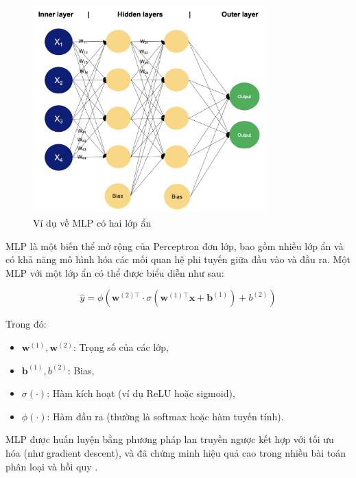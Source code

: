 \begin{figure}[H]
    \centering
    \includegraphics[width=0.8\textwidth]{image/section3_4/mlp.png}
    \caption{Ví dụ về MLP có hai lớp ẩn}
    \label{fig:section3_4__1}
\end{figure}


MLP là một biến thể mở rộng của Perceptron đơn lớp, bao gồm nhiều lớp ẩn và có khả năng mô hình hóa các mối quan hệ phi tuyến giữa đầu vào và đầu ra. Một MLP với một lớp ẩn có thể được biểu diễn như sau:

\[
\hat{y} = \phi(\mathbf{w}^{(2)\top} \cdot \sigma(\mathbf{w}^{(1)\top} \mathbf{x} + \mathbf{b}^{(1)}) + b^{(2)})
\]

Trong đó:
\begin{itemize}
    \item \(\mathbf{w}^{(1)}, \mathbf{w}^{(2)}\): Trọng số của các lớp,
    \item \(\mathbf{b}^{(1)}, b^{(2)}\): Bias,
    \item \(\sigma(\cdot)\): Hàm kích hoạt (ví dụ ReLU hoặc sigmoid),
    \item \(\phi(\cdot)\): Hàm đầu ra (thường là softmax hoặc hàm tuyến tính).
\end{itemize}

MLP được huấn luyện bằng phương pháp lan truyền ngược kết hợp với tối ưu hóa (như gradient descent), và đã chứng minh hiệu quả cao trong nhiều bài toán phân loại và hồi quy \cite{bishop1995neural}.
